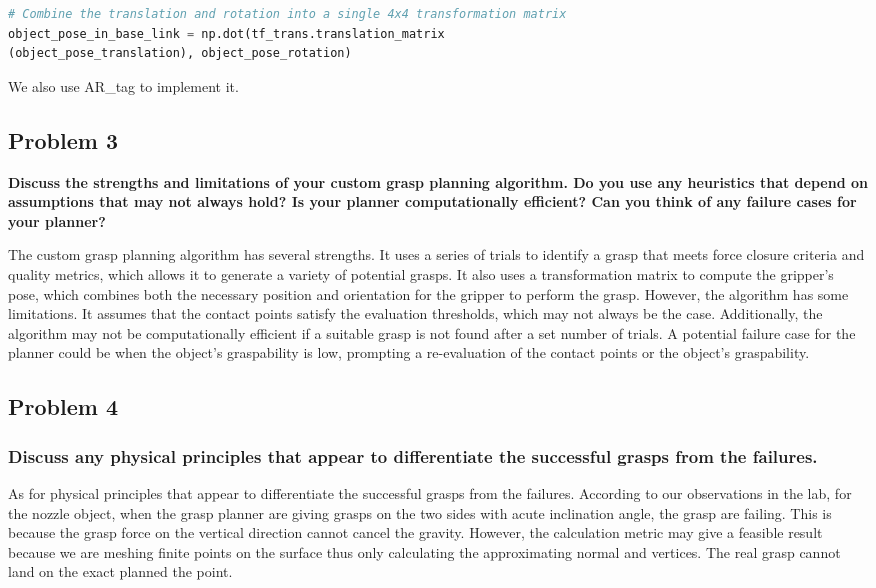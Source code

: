 \documentclass{article}
\begin{document}
\begin{multicols}{2}
\begin{lstlisting}[language=Python]
# Combine the translation and rotation into a single 4x4 transformation matrix
object_pose_in_base_link = np.dot(tf_trans.translation_matrix
(object_pose_translation), object_pose_rotation)
\end{lstlisting}

We also use AR\_tag to implement it. 


\subsection{Problem 3}
\textbf{Discuss the strengths and limitations of your custom grasp planning algorithm. Do you use any heuristics
that depend on assumptions that may not always hold? Is your planner computationally efficient? Can you think of any failure cases for your planner?}

The custom grasp planning algorithm has several strengths. It uses a series of trials to identify a grasp that meets force closure criteria and quality metrics, which allows it to generate a variety of potential grasps. It also uses a transformation matrix to compute the gripper's pose, which combines both the necessary position and orientation for the gripper to perform the grasp. However, the algorithm has some limitations. It assumes that the contact points satisfy the evaluation thresholds, which may not always be the case. Additionally, the algorithm may not be computationally efficient if a suitable grasp is not found after a set number of trials. A potential failure case for the planner could be when the object's graspability is low, prompting a re-evaluation of the contact points or the object's graspability.

\subsection{Problem 4}
\subsubsection{Discuss any physical principles that appear to differentiate the successful grasps from the failures.}


As for physical principles that appear to differentiate the successful grasps from the failures. According to our observations in the lab, for the nozzle object, when the grasp planner are giving grasps on the two sides with acute inclination angle, the grasp are failing. This is because the grasp force on the vertical direction cannot cancel the gravity. However, the calculation metric may give a feasible result because we are meshing finite points on the surface thus only calculating the approximating normal and vertices. The real grasp cannot land on the exact planned the point. 


\end{multicols}
\end{document}
